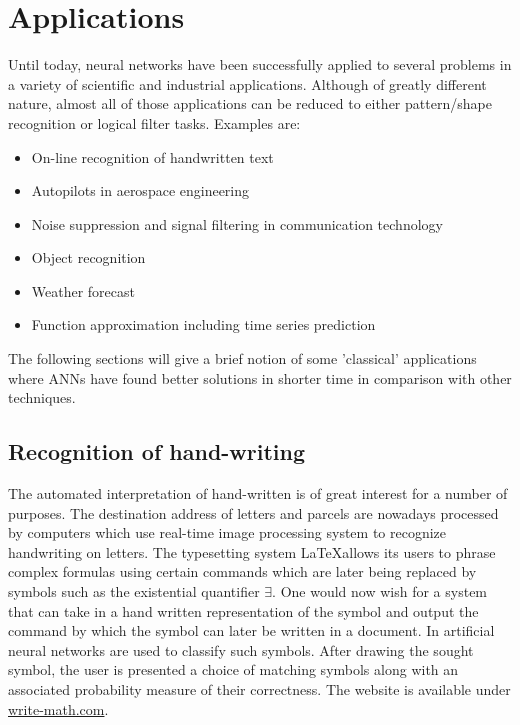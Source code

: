 \documentclass[10pt,a4paper,DIV=11]{scrreprt}
\begin{document}
\section{Applications}
Until today, neural networks have been successfully applied to several problems in a variety of scientific and industrial applications. Although of greatly different nature, almost all of those applications can be reduced to either pattern/shape recognition or logical filter tasks. Examples are:\\
\begin{itemize}
    \item On-line recognition of handwritten text
    \item Autopilots in aerospace engineering
    \item Noise suppression and signal filtering in communication technology 
    \item Object recognition
    \item Weather forecast
    \item Function approximation including time series prediction
\end{itemize}

The following sections will give a brief notion of some 'classical' applications where ANNs have found better solutions in shorter time in comparison with other techniques.
\subsection{Recognition of hand-writing}
The automated interpretation of hand-written is of great interest for a number of purposes. The destination address of letters and parcels are nowadays processed by computers which use real-time image processing system to recognize handwriting on letters. The typesetting system \LaTeX  allows its users to phrase complex formulas using certain commands which are later being replaced by symbols such as the existential quantifier $\exists$. 
One would now wish for a system that can take in a hand written representation of the symbol and output the command by which the symbol can later be written in a document. In \cite{MARTIN} artificial neural networks are used to classify such symbols. After drawing the sought symbol, the user is presented a choice of matching symbols along with an associated probability measure of their correctness. The website is available under \url{write-math.com}.
\\
\end{document}
